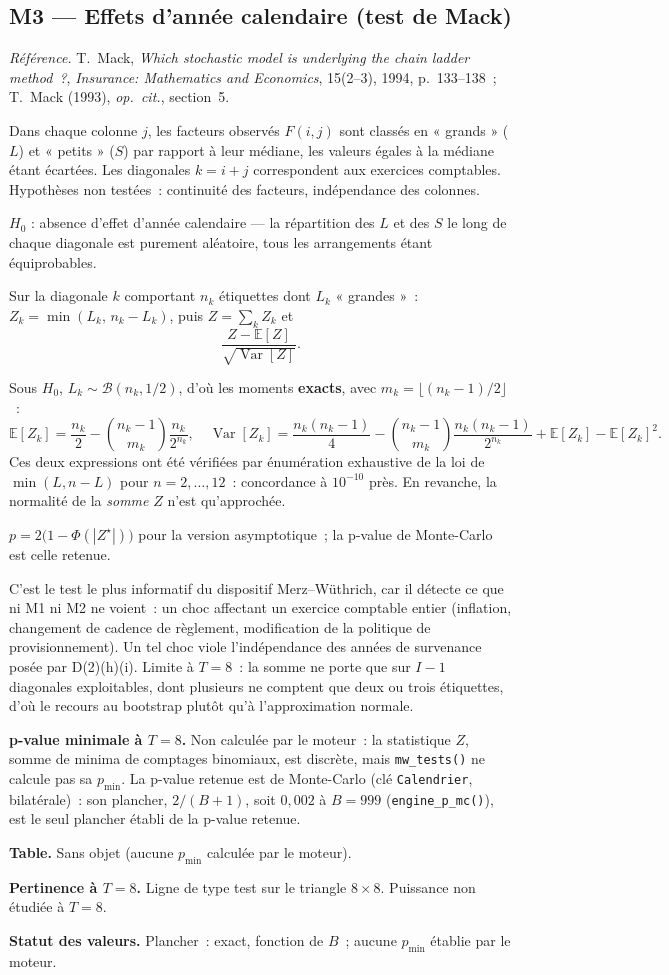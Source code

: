 \documentclass[a4paper,11pt]{article}
\newcommand{\code}[1]{\texttt{\small #1}}
\newcommand{\refl}[1]{{\small\textcolor{maincolor!70!black}{\textit{Référence.} #1}}\par\smallskip}
\newcounter{ficheid}
\newenvironment{fiche}[1]{%
  \stepcounter{ficheid}%
  \phantomsection
  \subsection{#1}%
  \label{fiche:\theficheid}%
}{%
  \end{description}\vspace{0.5em}%
}
\newcommand{\Cadre}{%
  \begin{description}[leftmargin=0pt, style=unboxed, itemsep=3pt, topsep=3pt, parsep=2pt]%
  \item[\textcolor{financeblue}{\textbf{1. Cadre, notations et hypothèses de validité (non testées).}}]}
\newcommand{\Hzero}{\item[\textcolor{financeblue}{\textbf{2. Hypothèse nulle.}}]}
\newcommand{\Stat}{\item[\textcolor{financeblue}{\textbf{3. Statistique de test.}}]}
\newcommand{\Loi}{\item[\textcolor{financeblue}{\textbf{4. Loi sous $H_0$.}}]}
\newcommand{\Pval}{\item[\textcolor{financeblue}{\textbf{5. p-value.}}]}
\newcommand{\Usage}{\item[\textcolor{financeblue}{\textbf{6. Usage et limites.}}]}
\newcommand{\Pertinence}{\item[\textcolor{financeblue}{\textbf{7. Pertinence et puissance à faible $T$.}}]}
\begin{document}
\begin{fiche}{M3 --- Effets d'année calendaire (test de Mack)}
\label{mw:m3cal}
\refl{T.~Mack, \emph{Which stochastic model is underlying the chain ladder
method~?}, \emph{Insurance: Mathematics and Economics}, 15(2--3), 1994,
p.~133--138~; T.~Mack (1993), \emph{op.\ cit.}, section~5.}
\Cadre
Dans chaque colonne $j$, les facteurs observés $F(i,j)$ sont classés en
« grands » ($L$) et « petits » ($S$) par rapport à leur médiane, les valeurs
égales à la médiane étant écartées. Les diagonales $k = i+j$ correspondent aux
exercices comptables. Hypothèses non testées~: continuité des facteurs,
indépendance des colonnes.
\Hzero
$H_0$ : absence d'effet d'année calendaire --- la répartition des $L$ et des $S$
le long de chaque diagonale est purement aléatoire, tous les arrangements étant
équiprobables.
\Stat
Sur la diagonale $k$ comportant $n_k$ étiquettes dont $L_k$ « grandes »~:
$Z_k = \min(L_k,\,n_k - L_k)$, puis $Z = \sum_k Z_k$ et
\[
  \frac{Z - \mathbb{E}[Z]}{\sqrt{\operatorname{Var}[Z]}} .
\]
\Loi
Sous $H_0$, $L_k \sim \mathcal{B}(n_k, 1/2)$, d'où les moments \textbf{exacts},
avec $m_k = \lfloor (n_k-1)/2 \rfloor$~:
\[
  \mathbb{E}[Z_k] = \frac{n_k}{2} - \binom{n_k-1}{m_k}\frac{n_k}{2^{n_k}},
  \quad
  \operatorname{Var}[Z_k] = \frac{n_k(n_k-1)}{4}
  - \binom{n_k-1}{m_k}\frac{n_k(n_k-1)}{2^{n_k}} + \mathbb{E}[Z_k] - \mathbb{E}[Z_k]^2 .
\]
Ces deux expressions ont été vérifiées par énumération exhaustive de la loi de
$\min(L, n-L)$ pour $n = 2,\dots,12$~: concordance à $10^{-10}$ près. En
revanche, la normalité de la \emph{somme} $Z$ n'est qu'approchée.
\Pval
$p = 2\big(1 - \Phi(|Z^\star|)\big)$ pour la version asymptotique~; la p-value de
Monte-Carlo est celle retenue.
\Usage
C'est le test le plus informatif du dispositif Merz--Wüthrich, car il détecte ce
que ni M1 ni M2 ne voient~: un choc affectant un exercice comptable entier
(inflation, changement de cadence de règlement, modification de la politique de
provisionnement). Un tel choc viole l'indépendance des années de survenance
posée par D(2)(h)(i). Limite à $T = 8$~: la somme ne porte que sur $I-1$
diagonales exploitables, dont plusieurs ne comptent que deux ou trois
étiquettes, d'où le recours au bootstrap plutôt qu'à l'approximation normale.
\Pertinence
\textbf{p-value minimale à $T = 8$.} Non calculée par le moteur~: la statistique $Z$, somme de minima de comptages binomiaux, est discrète, mais \code{mw\_tests()} ne calcule pas sa $p_{\min}$. La p-value retenue est de Monte-Carlo (clé \code{Calendrier}, bilatérale)~: son plancher, $2/(B+1)$, soit $0{,}002$ à $B = 999$ (\code{engine\_p\_mc()}), est le seul plancher établi de la p-value retenue.

\textbf{Table.} Sans objet (aucune $p_{\min}$ calculée par le moteur).

\textbf{Pertinence à $T = 8$.} Ligne de type test sur le triangle $8\times 8$. Puissance non étudiée à $T = 8$.

\textbf{Statut des valeurs.} Plancher~: exact, fonction de $B$~; aucune $p_{\min}$ établie par le moteur.
\end{fiche}
\end{document}

